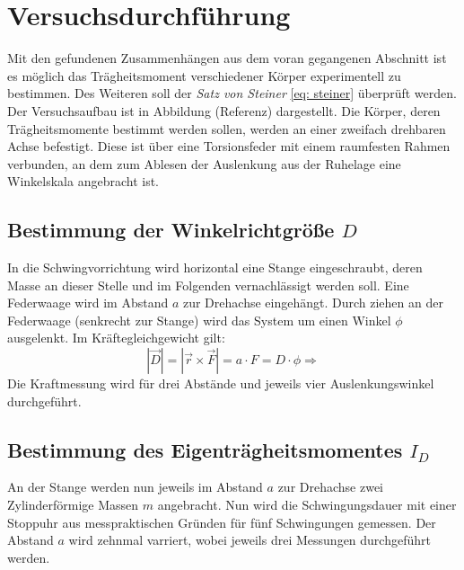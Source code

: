 \section{Versuchsdurchführung}
Mit den gefundenen Zusammenhängen aus dem voran gegangenen Abschnitt ist es
möglich das Trägheitsmoment verschiedener Körper experimentell zu bestimmen.
Des Weiteren soll der \textit{Satz von Steiner} \eqref{eq: steiner} überprüft
werden. \\
Der Versuchsaufbau ist in Abbildung (Referenz) dargestellt. Die Körper, deren
Trägheitsmomente bestimmt werden sollen, werden an einer zweifach drehbaren Achse
befestigt. Diese ist über eine Torsionsfeder mit einem raumfesten Rahmen verbunden,
an dem zum Ablesen der Auslenkung aus der Ruhelage eine Winkelskala angebracht ist.

\subsection{Bestimmung der Winkelrichtgröße $D$}
In die Schwingvorrichtung wird horizontal eine Stange eingeschraubt, deren Masse an dieser
Stelle und im Folgenden vernachlässigt werden soll. Eine Federwaage wird im Abstand $a$ zur
Drehachse eingehängt. Durch ziehen an der Federwaage (senkrecht zur Stange) wird das System um einen Winkel $\phi$
ausgelenkt. Im Kräftegleichgewicht gilt:
\begin{equation}
  \left| \vec{D} \right| = \left|\vec{r} \times \vec{F} \right| = a \cdot F = D \cdot \phi \Rightarrow
\end{equation}
Die Kraftmessung wird für drei Abstände und jeweils vier Auslenkungswinkel durchgeführt.

\subsection{Bestimmung des Eigenträgheitsmomentes $I_D$}
An der Stange werden nun jeweils im Abstand $a$ zur Drehachse zwei Zylinderförmige
Massen $m$ angebracht. Nun wird die Schwingungsdauer mit einer Stoppuhr
aus messpraktischen Gründen für fünf Schwingungen gemessen. Der Abstand $a$ wird zehnmal varriert, wobei jeweils
drei Messungen durchgeführt werden.

